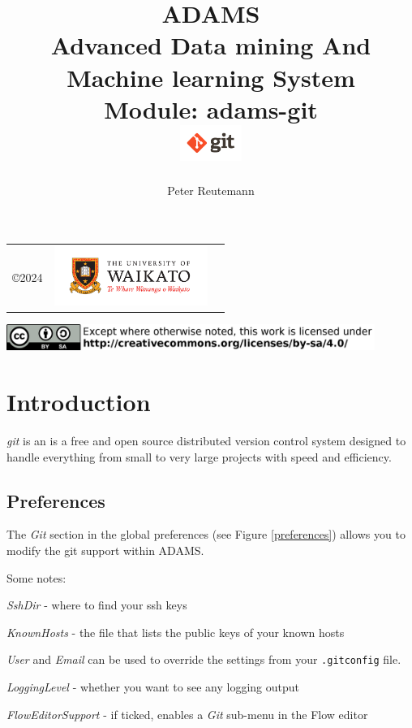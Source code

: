 \documentclass[a4paper]{book}
\title{
  \textbf{ADAMS} \\
  {\Large \textbf{A}dvanced \textbf{D}ata mining \textbf{A}nd \textbf{M}achine
  learning \textbf{S}ystem} \\
  {\Large Module: adams-git} \\
  \vspace{1cm}
  \includegraphics[width=2cm]{images/git-module.png} \\
}
\author{
  Peter Reutemann
}
\begin{document}
\begin{titlepage}
\maketitle

\thispagestyle{empty}
\center
\begin{table}[b]
	\begin{tabular}{c l l}
		\parbox[c][2cm]{2cm}{\copyright 2024} &
		\parbox[c][2cm]{5cm}{\includegraphics[width=5cm]{images/coat_of_arms.pdf}} \\
	\end{tabular}
	\includegraphics[width=12cm]{images/cc.png} \\
\end{table}

\end{titlepage}

\tableofcontents
\listoffigures


\chapter{Introduction}
\textit{git} is an is a free and open source distributed version control system designed to handle everything
from small to very large projects with speed and efficiency\cite{git}.

\section{Preferences}
The \textit{Git} section in the global preferences (see Figure \ref{preferences}) allows you to modify
the git support within ADAMS.

\noindent Some notes:
\begin{tight_itemize}
    \item \textit{SshDir} - where to find your ssh keys
    \item \textit{KnownHosts} - the file that lists the public keys of your known hosts
    \item \textit{User} and \textit{Email} can be used to override the settings from your \texttt{.gitconfig} file\cite{git-config}.
    \item \textit{LoggingLevel} - whether you want to see any logging output
    \item \textit{FlowEditorSupport} - if ticked, enables a \textit{Git} sub-menu in the Flow editor
\end{tight_itemize}
\end{document}
